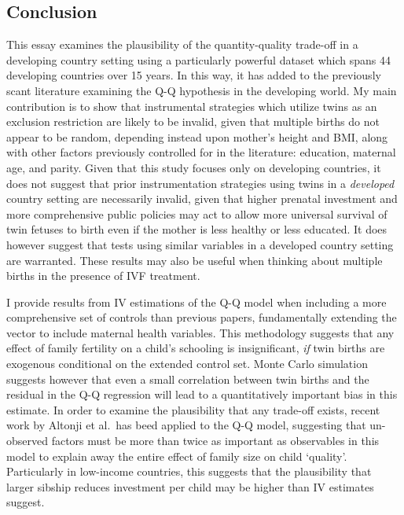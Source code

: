 \documentclass{article}[11pt,subeqn]
\begin{document}
\begin{spacing}{1.5}
\section{Conclusion}
\label{scn:conclusion}
This essay examines the plausibility of the quantity-quality trade-off in a developing country setting using a particularly powerful dataset which spans 44 developing countries 
over 15 years.  In this way, it has added to the previously scant literature examining the Q-Q hypothesis in the developing world.  My main contribution is to show that 
instrumental strategies which utilize twins as an exclusion restriction are likely to be invalid, given that multiple births do not appear to be random, depending instead upon mother's 
height and BMI, along with other factors previously controlled for in the literature: education, maternal age, and parity.  Given that this study focuses only on developing countries, 
it does not suggest that prior instrumentation strategies using twins in a \emph{developed} country setting are necessarily invalid, given that higher prenatal investment and
more comprehensive public policies may act to allow more universal survival of twin fetuses to birth even if the mother is less healthy or less educated.  It does however suggest 
that tests using similar variables in a developed country setting are warranted.  These results may also  be useful when thinking about multiple births in the presence of IVF treatment.

I provide results from IV estimations of the Q-Q model when including a more comprehensive set of controls than previous papers, fundamentally extending the vector to include 
maternal health variables. This methodology suggests that any effect of family fertility on a child's schooling is insignificant, \emph{if} twin births are exogenous conditional on 
the extended control set.  Monte Carlo simulation suggests however that even a small correlation between twin births and the residual in the Q-Q regression will lead to a 
quantitatively important bias in this estimate.  In order to examine the plausibility that any trade-off exists, recent work by Altonji et al.\ has beed applied to the Q-Q model, suggesting 
that un-observed factors must be more than twice as important as observables in this model to explain away the entire effect of family size on child `quality'.  Particularly in 
low-income countries, this suggests that the plausibility that larger sibship reduces investment per child may be higher than IV estimates suggest.


\end{spacing}
\end{document}
